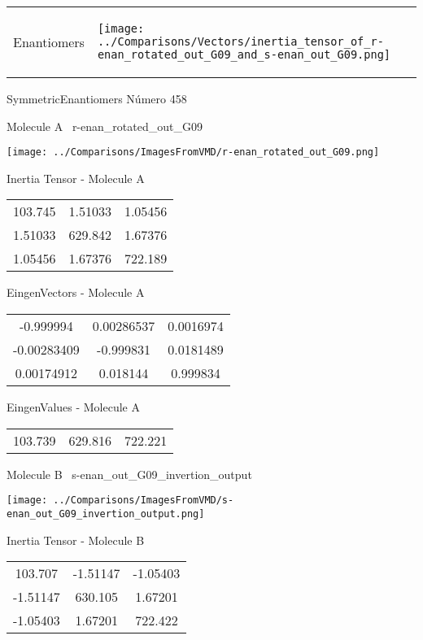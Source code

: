 \vtab[-5mm]
\begin{tabular}{*{2}{m{}}}
\begin{center}
\textcolor{NavyBlue}{\Large Enantiomers}
\end{center}
&
\begin{center}
\texttt{[image: ../Comparisons/Vectors/inertia\_tensor\_of\_r-enan\_rotated\_out\_G09\_and\_s-enan\_out\_G09.png]}
\end{center}
\end{tabular}

 \newpage

\vtab[-3cm]
\begin{center}
{\large SymmetricEnantiomers \tab Número 458}
\end{center}
\begin{multicols}{2}
\begin{center}

Molecule A \
r-enan\_rotated\_out\_G09

\texttt{[image: ../Comparisons/ImagesFromVMD/r-enan\_rotated\_out\_G09.png]}

Inertia Tensor - Molecule A \\
\begin{tabular}{|c c c|}
103.745	 & 	1.51033	 & 	1.05456	 \\
1.51033	 & 	629.842	 & 	1.67376	 \\
1.05456	 & 	1.67376	 & 	722.189
\end{tabular}

\vtab
 EingenVectors - Molecule A     \\
\begin{tabular}{|c c c|}
-0.999994	 & 	0.00286537	 & 	0.0016974	 \\
-0.00283409	 & 	-0.999831	 & 	0.0181489	 \\
0.00174912	 & 	0.018144	 & 	0.999834
\end{tabular}

\vtab
 EingenValues - Molecule A     \\
\begin{tabular}{|c c c|}
103.739	 & 	629.816	 & 	722.221	 \\
\end{tabular}
\columnbreak

Molecule B \
s-enan\_out\_G09\_invertion\_output

\texttt{[image: ../Comparisons/ImagesFromVMD/s-enan\_out\_G09\_invertion\_output.png]}

Inertia Tensor - Molecule B \\
\begin{tabular}{|c c c|}
103.707	 & 	-1.51147	 & 	-1.05403	 \\
-1.51147	 & 	630.105	 & 	1.67201	 \\
-1.05403	 & 	1.67201	 & 	722.422
\end{tabular}


\end{center}
\end{multicols}
